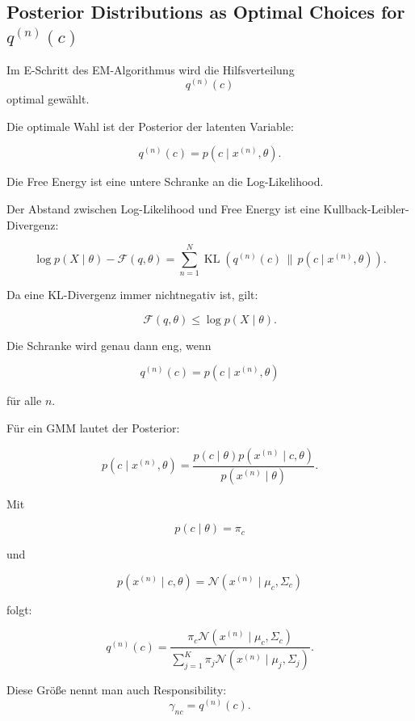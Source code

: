 \documentclass[11pt,a4paper]{scrartcl}
\begin{document}
\subsection{Posterior Distributions as Optimal Choices for \(q^{(n)}(c)\)}

\begin{notebox}
    Im E-Schritt des EM-Algorithmus wird die Hilfsverteilung
    \[
        q^{(n)}(c)
    \]
    optimal gewählt.

    Die optimale Wahl ist der Posterior der latenten Variable:

    \[
        q^{(n)}(c)
        =
        p(c\mid x^{(n)},\theta).
    \]
\end{notebox}

\begin{solutionbox}
    Die Free Energy ist eine untere Schranke an die Log-Likelihood.

    Der Abstand zwischen Log-Likelihood und Free Energy ist eine
    Kullback-Leibler-Divergenz:

    \[
        \log p(X\mid \theta)
        -
        \mathcal{F}(q,\theta)
        =
        \sum_{n=1}^{N}
        \operatorname{KL}
        \left(
            q^{(n)}(c)
            \,\|\, 
            p(c\mid x^{(n)},\theta)
        \right).
    \]

    Da eine KL-Divergenz immer nichtnegativ ist, gilt:

    \[
        \mathcal{F}(q,\theta)
        \leq
        \log p(X\mid \theta).
    \]

    Die Schranke wird genau dann eng, wenn

    \[
        q^{(n)}(c)
        =
        p(c\mid x^{(n)},\theta)
    \]

    für alle \(n\).
\end{solutionbox}

\begin{calculationbox}
    Für ein GMM lautet der Posterior:

    \[
        p(c\mid x^{(n)},\theta)
        =
        \frac{
            p(c\mid \theta)p(x^{(n)}\mid c,\theta)
        }{
            p(x^{(n)}\mid \theta)
        }.
    \]

    Mit

    \[
        p(c\mid \theta)=\pi_c
    \]

    und

    \[
        p(x^{(n)}\mid c,\theta)
        =
        \mathcal{N}(x^{(n)}\mid \mu_c,\Sigma_c)
    \]

    folgt:

    \[
        q^{(n)}(c)
        =
        \frac{
            \pi_c
            \mathcal{N}(x^{(n)}\mid \mu_c,\Sigma_c)
        }{
            \sum_{j=1}^{K}
            \pi_j
            \mathcal{N}(x^{(n)}\mid \mu_j,\Sigma_j)
        }.
    \]

    Diese Größe nennt man auch Responsibility:
    \[
        \gamma_{nc}
        =
        q^{(n)}(c).
    \]
\end{calculationbox}
\end{document}
